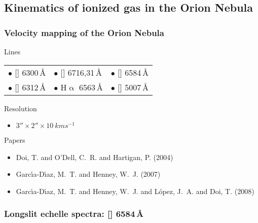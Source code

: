 \documentclass[presentation]{beamer}
\begin{document}
\subsection{Kinematics of ionized gas in the Orion Nebula}
\newcommand\ha{H\(\upalpha\) 6563\,\AA}
\newcommand\nii{[\ion{N}{2}] 6584\,\AA}
\newcommand\oi{[\ion{O}{1}] 6300\,\AA} 
\newcommand\sii{[\ion{S}{2}] 6716,31\,\AA}
\newcommand\siil{[\ion{S}{2}] 6731\,\AA}
\newcommand\siii{[\ion{S}{3}] 6312\,\AA}
\newcommand\oiii{[\ion{O}{3}] 5007\,\AA} 
\newcommand\Bull{\ensuremath{\bullet}}

\begin{frame}
  \frametitle{Velocity mapping of the Orion Nebula}
  \begin{block}{Lines}
    \smallskip
    \begin{centering}
      \begin{tabular}{@{}l@{\quad\quad}l@{\quad\quad}l@{}}
        \Bull{} \oi{} & \Bull{} \sii{} & \Bull{} \nii{} \\
        \Bull{} \siii{} & \Bull{} \ha{} & \Bull{} \oiii{}
      \end{tabular}\par
    \end{centering}
  \end{block}
  \begin{block}{Resolution}
    \begin{itemize}
    \item  \(3'' \times 2'' \times \SI{10}{km s^{-1}}\)
    \end{itemize}
  \end{block}
  \begin{block}{Papers}
    \begin{itemize}
    \item {Doi}, T. and {O'Dell}, C.~R. and {Hartigan}, P. (2004)
    \item {Garc{\'{\i}}a-D{\'{\i}}az}, M.~T. and {Henney},
      W.~J. (2007)
    \item {Garc{\'{\i}}a-D{\'{\i}}az}, M.~T. and {Henney}, W.~J. and
      {López}, J.~A. and {Doi}, T. (2008)
    \end{itemize}
  \end{block}
\end{frame}
\begin{frame}
  \frametitle{Longslit echelle spectra: [] 6584\,\AA}
  \begin{centering}
    \par
  \end{centering}
\end{frame}
\end{document}
